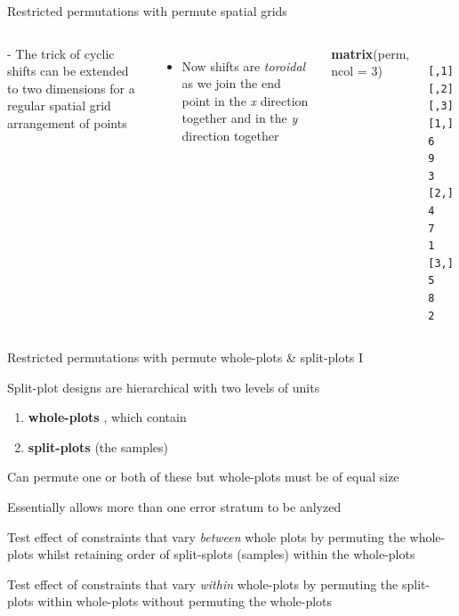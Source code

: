 \documentclass[10pt,ignorenonframetext,compress, aspectratio=169]{beamer}
\newenvironment{Shaded}{\begin{snugshade}}{\end{snugshade}}
\newcommand{\KeywordTok}[1]{\textcolor[rgb]{0.13,0.29,0.53}{\textbf{{#1}}}}
\newcommand{\DataTypeTok}[1]{\textcolor[rgb]{0.13,0.29,0.53}{{#1}}}
\newcommand{\DecValTok}[1]{\textcolor[rgb]{0.00,0.00,0.81}{{#1}}}
\newcommand{\NormalTok}[1]{{#1}}
\newcommand{\columnsbegin}{\begin{columns}}
\newcommand{\columnsend}{\end{columns}}
\begin{document}
\begin{frame}[fragile]{Restricted permutations with permute \textbar{}
spatial grids}

\columnsbegin
{} - The trick of cyclic shifts can be extended to
two dimensions for a regular spatial grid arrangement of points

\begin{itemize}
\itemsep1pt\parskip0pt
\item
  Now shifts are \emph{toroidal} as we join the end point in the
  \emph{x} direction together and in the \emph{y} direction together
\end{itemize}

\scriptsize

\normalsize


\scriptsize

\begin{Shaded}
\begin{Highlighting}[]
\KeywordTok{matrix}\NormalTok{(perm, }\DataTypeTok{ncol =} \DecValTok{3}\NormalTok{)}
\end{Highlighting}
\end{Shaded}

\begin{verbatim}
     [,1] [,2] [,3]
[1,]    6    9    3
[2,]    4    7    1
[3,]    5    8    2
\end{verbatim}

\normalsize
\columnsend

\end{frame}

\begin{frame}{Restricted permutations with permute \textbar{}
whole-plots \& split-plots I}

Split-plot designs are hierarchical with two levels of units

\begin{enumerate}
\def\labelenumi{\arabic{enumi}.}
\itemsep1pt\parskip0pt
\item
  \textbf{whole-plots} , which contain
\item
  \textbf{split-plots} (the samples)
\end{enumerate}

Can permute one or both of these but whole-plots must be of equal size

Essentially allows more than one error stratum to be anlyzed

Test effect of constraints that vary \emph{between} whole plots by
permuting the whole-plots whilst retaining order of split-splots
(samples) within the whole-plots

Test effect of constraints that vary \emph{within} whole-plots by
permuting the split-plots within whole-plots without permuting the
whole-plots

\end{frame}
\end{document}
